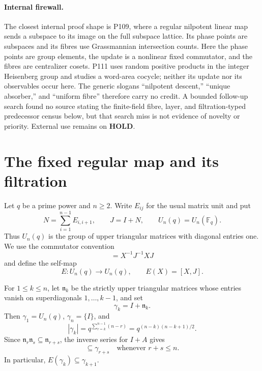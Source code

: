\documentclass[10pt,a4paper]{amsart}
\theoremstyle{definition}
\theoremstyle{remark}
\newcommand{\F}{\mathbb F}
\begin{document}
\paragraph{Internal firewall.}
The closest internal proof shape is P109, where a regular nilpotent linear
map sends a subspace to its image on the full subspace lattice.  Its phase
points are subspaces and its fibres use Grassmannian intersection counts.
Here the phase points are group elements, the update is a nonlinear fixed
commutator, and the fibres are centralizer cosets.  P111 uses random positive
products in the integer Heisenberg group and studies a word-area cocycle;
neither its update nor its observables occur here.  The generic slogans
``nilpotent descent,'' ``unique absorber,'' and ``uniform fibre'' therefore
carry no credit.  A bounded follow-up search found no source stating the
finite-field fibre, layer, and filtration-typed predecessor census below,
but that search miss is not evidence of novelty or priority.  External use
remains on \textbf{HOLD}.

\section{The fixed regular map and its filtration}
\label{sec:setup}

Let $q$ be a prime power and $n\ge2$.  Write $E_{ij}$ for the usual matrix
unit and put
\[
 N=\sum_{i=1}^{n-1}E_{i,i+1},\qquad J=I+N,\qquad
 U_n(q)=U_n(\F_q).
\]
Thus $U_n(q)$ is the group of upper triangular matrices with diagonal
entries one.  We use the commutator convention
\begin{equation}
 [X,J]=X^{-1}J^{-1}XJ
 \label{eq:commutator}
\end{equation}
and define the self-map
\[
                    E:U_n(q)\longrightarrow U_n(q),\qquad E(X)=[X,J].
\]

For $1\le k\le n$, let $\mathfrak n_k$ be the strictly upper triangular
matrices whose entries vanish on superdiagonals $1,\ldots,k-1$, and set
\[
              \gamma_k=I+\mathfrak n_k.
\]
Then $\gamma_1=U_n(q)$, $\gamma_n=\{I\}$, and
\begin{equation}
 |\gamma_k|
   =q^{\sum_{r=k}^{n-1}(n-r)}
   =q^{(n-k)(n-k+1)/2}.
 \label{eq:gamma-size}
\end{equation}
Since $\mathfrak n_r\mathfrak n_s\subseteq\mathfrak n_{r+s}$, the inverse
series for $I+A$ gives
\begin{equation}
 [\gamma_r,\gamma_s]\subseteq\gamma_{r+s}
 \quad\text{whenever }r+s\le n.
 \label{eq:filtration-product}
\end{equation}
In particular, $E(\gamma_k)\subseteq\gamma_{k+1}$.
\end{document}
